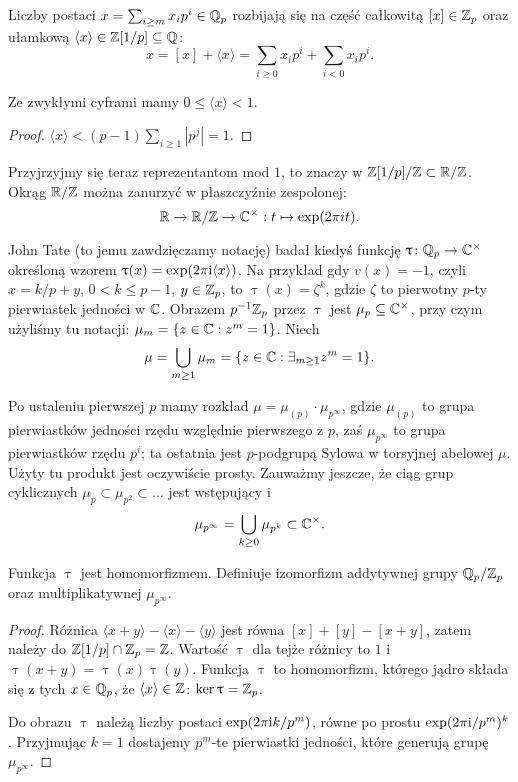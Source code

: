 \begin{definicja} \label{cptmetal}
	Liczby postaci $x = \sum_{i \ge m} x_i p^i \in \mathbb Q_p$ rozbijają się na część całkowitą $[x] \in \mathbb Z_p$ oraz ułamkową $\langle x \rangle \in \mathbb Z[1/p] \subseteq \mathbb Q$:
	\[
		x = [x] + \langle x \rangle = \sum_{i \ge 0} x_i p^i + \sum_{i < 0} x_i p^i.
	\]
\end{definicja}

\begin{fakt}
	Ze zwykłymi cyframi mamy $0 \le \langle x \rangle < 1$.
\end{fakt}

\begin{proof}
	$\langle x \rangle < (p-1) \sum_{i \ge 1} |p^j| = 1$.
\end{proof}

Przyjrzyjmy się teraz reprezentantom mod $1$, to znaczy w $\mathbb Z[1/p] / \mathbb Z \subset \mathbb R / \mathbb Z$.
Okrąg $\mathbb R / \mathbb Z$ można zanurzyć w płaszczyźnie zespolonej:
\[
	\mathbb R \to \mathbb R / \mathbb Z \to \mathbb C^\times : t \mapsto \exp (2 \pi i t).
\]

John Tate (to jemu zawdzięczamy notację) badał kiedyś funkcję $\uptau \colon \mathbb Q_p \to \mathbb C^\times$ określoną wzorem $\uptau(x) = \exp(2 \pi \textrm{i} \langle x \rangle)$.
Na przykład gdy $v(x) = -1$, czyli $x = k/p + y$, $0 < k \le p-1$, $y \in \mathbb Z_p$, to $\uptau(x) = \zeta^k$, gdzie $\zeta$ to pierwotny $p$-ty pierwiastek jedności w $\mathbb C$.
Obrazem $p^{-1} \mathbb Z_p$ przez $\uptau$ jest $\mu_p \subseteq \mathbb C^\times$, przy czym użyliśmy tu notacji: $\mu_m = \{z \in \mathbb C : z^m = 1\}$.
Niech
\[
	\mu = \bigcup_{m \ge 1} \mu_m = \{z \in \mathbb C : \exists_{m \ge 1} z^m = 1\}.
\]

Po ustaleniu pierwszej $p$ mamy rozkład $\mu = \mu_{(p)} \cdot \mu_{p^\infty}$, gdzie $\mu_{(p)}$ to grupa pierwiastków jedności rzędu względnie pierwszego z $p$, zaś $\mu_{p^\infty}$ to grupa pierwiastków rzędu $p^i$; ta ostatnia jest $p$-podgrupą Sylowa w torsyjnej abelowej $\mu$.
Użyty tu produkt jest oczywiście prosty.
Zauważmy jeszcze, że ciąg grup cyklicznych $\mu_p \subset \mu_{p^2} \subset \ldots$ jest wstępujący i
\[
	\mu_{p^\infty} = \bigcup_{k \ge 0} \mu_{p^k} \subset \mathbb C^\times.
\]

\begin{fakt}
	Funkcja $\uptau$ jest homomorfizmem.
	Definiuje izomorfizm addytywnej grupy $\mathbb Q_p/\mathbb Z_p$ oraz multiplikatywnej $\mu_{p^\infty}$.
\end{fakt}

\begin{proof}
	Różnica $\langle x+y \rangle - \langle x \rangle - \langle y \rangle$ jest równa $[x]+[y] - [x+y]$, zatem należy do $\mathbb Z[1/p] \cap \mathbb Z_p = \mathbb Z$.
	Wartość $\uptau$ dla tejże różnicy to $1$ i $\uptau(x+y) = \uptau(x) \uptau(y)$.
	Funkcja $\uptau$ to homomorfizm, którego jądro składa się z tych $x \in \mathbb Q_p$, że $\langle x \rangle \in \mathbb Z$: $\ker \uptau = \mathbb Z_p$.

	Do obrazu $\uptau$ należą liczby postaci $\exp(2\pi \textrm{i} k/p^m)$, równe po prostu $\exp(2 \pi \textrm{i} / p^m)^k$.
	Przyjmując $k = 1$ dostajemy $p^m$-te pierwiastki jedności, które generują grupę $\mu_{p^\infty}$.
\end{proof}

